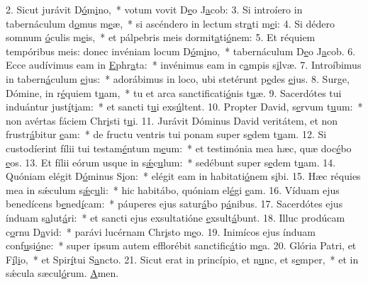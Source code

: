 2. Sicut jurávit D\uline{ó}m\uline{i}no,~* votum vovit D\uline{e}o J\uline{a}cob:
3. Si introíero in tabernáculum d\uline{o}mus m\uline{e}æ,~* si ascéndero in lectum str\uline{a}ti m\uline{e}i:
4. Si dédero somnum \uline{ó}culis m\uline{e}is,~* et pálpebris meis dormit\uline{a}ti\uline{ó}nem:
5. Et réquiem tempóribus meis: donec invéniam locum D\uline{ó}m\uline{i}no,~* tabernáculum D\uline{e}o J\uline{a}cob.
6. Ecce audívimus eam in \uline{E}phr\uline{a}ta:~* invénimus eam in c\uline{a}mpis s\uline{i}lvæ.
7. Introíbimus in tabern\uline{á}culum \uline{e}jus:~* adorábimus in loco, ubi stetérunt p\uline{e}des \uline{e}jus.
8. Surge, Dómine, in r\uline{é}quiem t\uline{u}am,~* tu et arca sanctificati\uline{ó}nis t\uline{u}æ.
9. Sacerdótes tui induántur just\uline{í}t\uline{i}am:~* et sancti t\uline{u}i exs\uline{ú}ltent.
10. Propter David, s\uline{e}rvum t\uline{u}um:~* non avértas fáciem Chr\uline{i}sti t\uline{u}i.
11. Jurávit Dóminus David veritátem, et non frustr\uline{á}bitur \uline{e}am:~* de fructu ventris tui ponam super s\uline{e}dem t\uline{u}am.
12. Si custodíerint fílii tui testam\uline{é}ntum m\uline{e}um:~* et testimónia mea hæc, quæ doc\uline{é}bo \uline{e}os.
13. Et fílii eórum usque in s\uline{ǽ}c\uline{u}lum:~* sedébunt super s\uline{e}dem t\uline{u}am.
14. Quóniam elégit D\uline{ó}minus S\uline{i}on:~* elégit eam in habitati\uline{ó}nem s\uline{i}bi.
15. Hæc réquies mea in sǽculum s\uline{ǽ}c\uline{u}li:~* hic habitábo, quóniam el\uline{é}gi \uline{e}am.
16. Víduam ejus benedícens b\uline{e}ned\uline{í}cam:~* páuperes ejus satur\uline{á}bo p\uline{á}nibus.
17. Sacerdótes ejus índuam s\uline{a}lut\uline{á}ri:~* et sancti ejus exsultatióne \uline{e}xsult\uline{á}bunt.
18. Illuc prodúcam c\uline{o}rnu D\uline{a}vid:~* parávi lucérnam Chr\uline{i}sto m\uline{e}o.
19. Inimícos ejus índuam conf\uline{u}si\uline{ó}ne:~* super ipsum autem efflorébit sanctific\uline{á}tio m\uline{e}a.
20. Glória Patri, et F\uline{í}l\uline{i}o,~* et Spir\uline{í}tui S\uline{a}ncto.
21. Sicut erat in princípio, et n\uline{u}nc, et s\uline{e}mper,~* et in sǽcula sæcul\uline{ó}rum. \uline{A}men.

